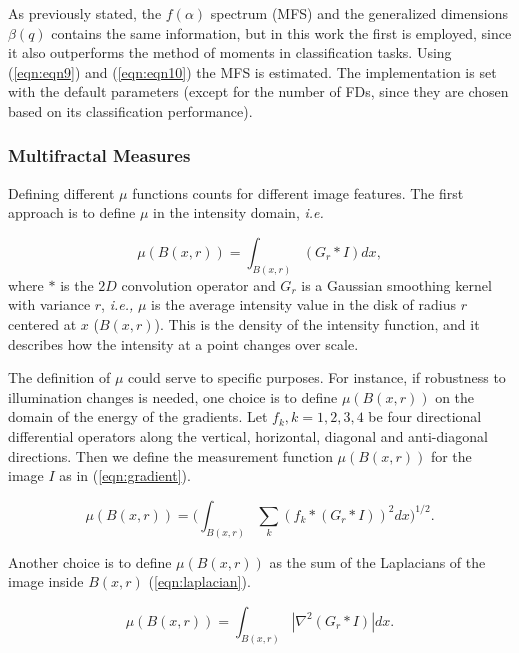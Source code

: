 \documentclass[a4paper,10pt]{article}
\begin{document}
As previously stated, the $f(\alpha)$ spectrum (MFS) and the generalized dimensions $\beta(q)$ contains the same information, but in this work the first is employed, since it also outperforms the method of moments in classification tasks. Using (\ref{eqn:eqn9}) and (\ref{eqn:eqn10}) the MFS is estimated. The implementation is set with the default parameters (except for the number of FDs, since they are chosen based on its classification performance).


\subsubsection{Multifractal Measures}
Defining different $\mu$ functions counts for different image features. The first approach is to define $\mu$ in the intensity domain, {\em i.e.}

\begin{equation}
\mu(B(x,r)) = \int_{B(x,r)}{(G_{r} \ast I)} dx,
\label{eqn:eqn11}
\end{equation}
where $\ast$ is the $2D$ convolution operator and $G_{r}$ is a Gaussian smoothing kernel with variance $r$, {\em i.e., } $\mu$ is the average intensity value in the disk of radius $r$ centered at $x$ ($B(x,r)$). This is the density of the intensity function, and it describes how the intensity at a point changes over scale.

The definition of $\mu$ could serve to specific purposes. For instance, if robustness to illumination changes is needed, one choice is to define $\mu(B(x,r))$ on the domain of the energy of the gradients. Let ${ f_{k} , k = 1, 2, 3, 4}$ be four directional differential operators along the vertical, horizontal, diagonal and anti-diagonal directions. Then we define the measurement function $\mu(B(x,r))$ for the image $I$ as in (\ref{eqn:gradient}).

\begin{equation}
\mu(B(x,r)) = (\int_{B(x,r)}{\sum_{k}{(f_{k} \ast (G_{r} \ast I))^{2}} dx)^{1/2}}.
\label{eqn:gradient}
\end{equation}

Another choice is to define $μ(B(x, r))$ as the sum of the Laplacians of the image inside $B(x, r)$ (\ref{eqn:laplacian}).

\begin{equation}
\mu(B(x,r)) = \int_{B(x,r)}|\nabla^2 (G_{r} \ast I)| dx.
\label{eqn:laplacian}
\end{equation}
\end{document}
